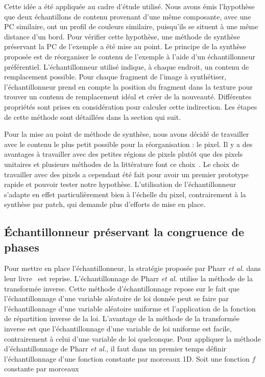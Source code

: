 \bigskip

Cette idée a été appliquée au cadre d'étude utilisé. Nous avons émis l'hypothèse que deux échantillons de contenu provenant d'une même composante, avec une PC similaire, ont un profil de couleurs similaire, puisqu'ils se situent à une même distance d'un bord. Pour vérifier cette hypothèse, une méthode de synthèse préservant la PC de l'exemple a été mise au point. Le principe de la synthèse proposée est de réorganiser le contenu de l'exemple à l'aide d'un échantillonneur préférentiel. L'échantillonneur utilisé indique, à chaque endroit, un contenu de remplacement possible. Pour chaque fragment de l'image à synthétiser, l'échantillonneur prend en compte la position du fragment dans la texture pour trouver un contenu de remplacement idéal et créer de la nouveauté. Différentes propriétés sont prises en considération pour calculer cette indirection. Les étapes de cette méthode sont détaillées dans la section qui suit.

\bigskip

Pour la mise au point de méthode de synthèse, nous avons décidé de travailler avec le contenu le plus petit possible pour la réorganisation : le pixel. Il y a des avantages à travailler avec des petites régions de pixels plutôt que des pixels unitaires et plusieurs méthodes de la littérature font ce choix~\cite{wei_state_2009}. Le choix de travailler avec des pixels a cependant été fait pour avoir un premier prototype rapide et pouvoir tester notre hypothèse. L'utilisation de l'échantillonneur s'adapte en effet particulièrement bien à l'échelle du pixel, contrairement à la synthèse par patch, qui demande plus d'efforts de mise en place.

\subsection{Échantillonneur préservant la congruence de phases}

Pour mettre en place l'échantillonneur, la stratégie proposée par Pharr \textit{et al.} dans leur livre~\cite{pharr_physically_2023} est reprise. L'échantillonnage de Pharr \textit{et al.} utilise la méthode de la transformée inverse. Cette méthode d'échantillonnage repose sur le fait que l'échantillonnage d'une variable aléatoire de loi donnée peut se faire par l'échantillonnage d'une variable aléatoire uniforme et l'application de la fonction de répartition inverse de la loi. L'avantage de la méthode de la transformée inverse est que l'échantillonnage d'une variable de loi uniforme est facile, contrairement à celui d'une variable de loi quelconque. Pour appliquer la méthode d'échantillonnage de Pharr \textit{et al.}, il faut dans un premier temps définir l'échantillonnage d'une fonction constante par morceaux 1D. Soit une fonction $f$ constante par morceaux

